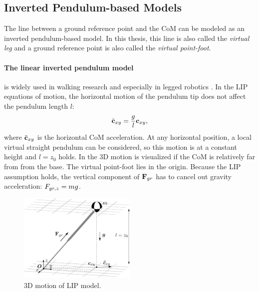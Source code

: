 \subsection{Inverted Pendulum-based Models}
The line between a ground reference point and the \ac{CoM} can be modeled as an inverted pendulum-based model. In this thesis, this line is also called the \textit{virtual leg} and a ground reference point is also called the \textit{virtual point-foot}.

\paragraph{The linear inverted pendulum model} is widely used in walking research and especially in legged robotics \cite{kajita20013d}. In the \ac{LIP} equations of motion, the horizontal motion of the pendulum tip does not affect the pendulum length $l$:
\begin{equation}
\ddot{\mathbf{c}}_{xy}=\frac{g}{l}\mathbf{c}_{xy},
\label{eq:LIPeom}
\end{equation}
where $\ddot{\mathbf{c}}_{xy}$ is the horizontal \ac{CoM} acceleration. At any horizontal position, a local virtual straight pendulum can be considered, so this motion is at a constant height and $l=z_0$  holds. In  the \ac{3D} motion is visualized if the \ac{CoM} is relatively far from from the base. The virtual point-foot lies in the origin. Because the \ac{LIP} assumption holds, the vertical component of $\mathbf{F}_{gr}$ has to cancel out gravity acceleration: $F_{gr,z}=mg$.\\
\begin{figure}[h]
\centering
\includegraphics[width=0.5\textwidth]{STYLESTUFF/3DCoMwithoutfoot.png}
\caption{\ac{3D} motion of \ac{LIP} model.}
\label{fig:3dlip}
\end{figure}

